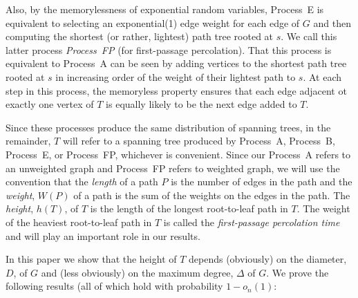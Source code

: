 \documentclass[lotsofwhite]{patmorin}
\begin{document}
Also, by the memorylessness of exponential random variables, Process~E
is equivalent to selecting an exponential(1) edge weight for each edge
of $G$ and then computing the shortest (or rather, lightest) path
tree rooted at $s$.  We call this latter process \emph{Process~FP}
(for first-passage percolation).  That this process is equivalent to
Process~A can be seen by adding vertices to the shortest path tree rooted
at $s$ in increasing order of the weight of their lightest path to $s$.
At each step in this process, the memoryless property ensures that each
edge adjacent ot exactly one vertex of $T$ is equally likely to be the
next edge added to $T$.  

Since these processes produce the same distribution of spanning trees,
in the remainder, $T$ will refer to a spanning tree produced by Process~A,
Process~B, Process~E, or Process~FP, whichever is convenient.  Since our
Process~A refers to an unweighted graph and Process~FP refers to weighted
graph, we will use the convention that the \emph{length} of a path $P$ is
the number of edges in the path and the \emph{weight}, $W(P)$ of a path
is the sum of the weights on the edges in the path. The \emph{height},
$h(T)$, of $T$ is the length of the longest root-to-leaf path in $T$.
The weight of the heaviest root-to-leaf path in $T$ is called the
\emph{first-passage percolation time} and will play an important role
in our results.

In this paper we show that the height of $T$ depends (obviously)
on the diameter, $D$, of $G$ and (less obviously) on the maximum degree,
$\Delta$ of $G$.  We prove the following results (all of which hold
with probability $1-o_n(1)$:
\end{document}
